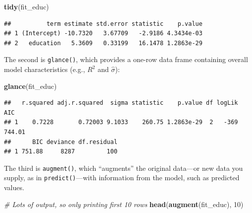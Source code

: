 \documentclass[12pt,oneside,openany]{book}
\newenvironment{Shaded}{\begin{snugshade}}{\end{snugshade}}
\newcommand{\KeywordTok}[1]{\textcolor[rgb]{0.13,0.29,0.53}{\textbf{#1}}}
\newcommand{\DecValTok}[1]{\textcolor[rgb]{0.00,0.00,0.81}{#1}}
\newcommand{\CommentTok}[1]{\textcolor[rgb]{0.56,0.35,0.01}{\textit{#1}}}
\newcommand{\NormalTok}[1]{#1}
\begin{document}
\begin{Shaded}
\begin{Highlighting}[]
\KeywordTok{tidy}\NormalTok{(fit_educ)}
\end{Highlighting}
\end{Shaded}

\begin{verbatim}
##          term estimate std.error statistic    p.value
## 1 (Intercept) -10.7320   3.67709   -2.9186 4.3434e-03
## 2   education   5.3609   0.33199   16.1478 1.2863e-29
\end{verbatim}

The second is \texttt{glance()}, which provides a one-row data frame
containing overall model characteristics (e.g., \(R^2\) and
\(\hat{\sigma}\)):

\begin{Shaded}
\begin{Highlighting}[]
\KeywordTok{glance}\NormalTok{(fit_educ)}
\end{Highlighting}
\end{Shaded}

\begin{verbatim}
##   r.squared adj.r.squared  sigma statistic    p.value df logLik    AIC
## 1    0.7228       0.72003 9.1033    260.75 1.2863e-29  2   -369 744.01
##      BIC deviance df.residual
## 1 751.88     8287         100
\end{verbatim}

The third is \texttt{augment()}, which ``augments'' the original
data---or new data you supply, as in \texttt{predict()}---with
information from the model, such as predicted values.

\begin{Shaded}
\begin{Highlighting}[]
\CommentTok{# Lots of output, so only printing first 10 rows}
\KeywordTok{head}\NormalTok{(}\KeywordTok{augment}\NormalTok{(fit_educ), }\DecValTok{10}\NormalTok{)}
\end{Highlighting}
\end{Shaded}
\end{document}
